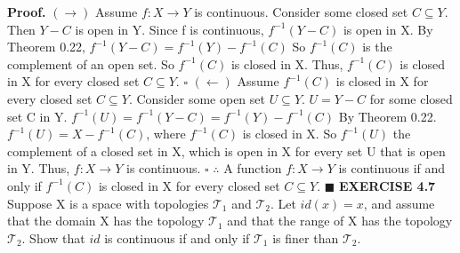 \documentclass[12pt]{article}
\begin{document}
  \newline \newline
  \textbf{Proof.}
  \newline
  \((\rightarrow)\) Assume \(f:X \rightarrow Y\) is continuous.
  \newline
  Consider some closed set \(C \subseteq Y\).
  \newline
  Then \(Y-C\) is open in Y.
  \newline
  Since f is continuous, \(f^{-1}(Y-C)\) is open in X.
  \newline \newline
  By Theorem 0.22, \(f^{-1}(Y-C) = f^{-1}(Y) - f^{-1}(C)\)
  \newline
  So \(f^{-1}(C)\) is the complement of an open set.
  \newline
  So \(f^{-1}(C)\) is closed in X.
  \newline
  Thus, \(f^{-1}(C)\) is closed in X for every closed set \(C \subseteq Y\).
  \newline \(\square\) \newline
  \((\leftarrow)\) Assume \(f^{-1}(C)\) is closed in X for every closed set \(C \subseteq Y\).
  \newline
  Consider some open set \(U \subseteq Y\).
  \newline
  \(U = Y - C\) for some closed set C in Y.
  \newline \newline
  \(f^{-1}(U)=f^{-1}(Y-C) = f^{-1}(Y) - f^{-1}(C)\) By Theorem 0.22.
  \newline
  \(f^{-1}(U) = X - f^{-1}(C)\), where \(f^{-1}(C)\) is closed in X.
  \newline
  So \(f^{-1}(U)\) the complement of a closed set in X, which is open in X for every set U that is open in Y.
  \newline
  Thus, \(f:X \rightarrow Y\) is continuous.
  \newline \(\square\) \newline
  \(\therefore\) A function \(f:X \rightarrow Y\) is continuous if and only if \(f^{-1}(C)\) is closed in X for every closed set \(C \subseteq Y\).
  \newline \(\blacksquare\)
  \newpage
  \noindent
  \textbf{EXERCISE 4.7}
  \newline
  Suppose X is a space with topologies \(\mathcal{T}_1\) and \(\mathcal{T}_2\). Let \(id(x) = x\), and assume that the domain X has the topology \(\mathcal{T}_1\) and that the range of X has the topology \(\mathcal{T}_2\). Show that \(id\) is continuous if and only if \(\mathcal{T}_1\) is finer than \(\mathcal{T}_2\).
\end{document}
